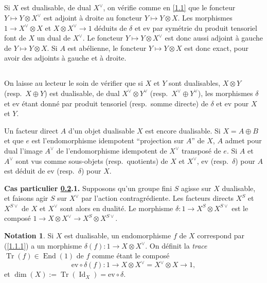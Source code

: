 \documentclass[11pt,a4paper]{article}
\theoremstyle{plain}
\theoremstyle{definition}
\newtheorem{notation}[theorem]{Notation}
\DeclareMathOperator{\End}{End}
\DeclareMathOperator{\Tr}{Tr}
\DeclareMathOperator{\Id}{Id}
\newcommand{\ev}{\mathrm{ev}}
\begin{document}
\subsection{}\label{1.14}

Si $X$ est dualisable, de dual $X^\vee$, on v\'erifie comme en \ref{1.1} que le foncteur $Y\mapsto Y\otimes X^\vee$ est adjoint \`a droite au foncteur $Y\mapsto Y\otimes X$. Les morphismes $1\to X^\vee\otimes X$ et $X\otimes X^\vee\to 1$ d\'eduits de $\delta$ et $\ev$ par sym\'etrie du produit tensoriel font de $X$ un dual de $X^\vee$. Le foncteur $Y\mapsto Y\otimes X^\vee$ est donc aussi adjoint \`a gauche de $Y\mapsto Y\otimes X$. Si $A$ est ab\'elienne, le foncteur $Y\mapsto Y\otimes X$ est donc exact, pour avoir des adjoints \`a gauche et \`a droite.

\subsection{}\label{1.15}

On laisse au lecteur le soin de v\'erifier que si $X$ et $Y$ sont dualisables, $X\otimes Y$ (resp.~$X\oplus Y$) est dualisable, de dual $X^\vee\otimes Y^\vee$ (resp.~$X^\vee\oplus Y^\vee$), les morphismes $\delta$ et $\ev$ \'etant donn\'e par produit tensoriel (resp.~somme directe) de $\delta$ et $\ev$ pour $X$ et $Y$.

Un facteur direct $A$ d'un objet dualisable $X$ est encore dualisable. Si $X=A\oplus B$ et que $e$ est l'endomorphisme idempotent ``projection sur $A$'' de $X$, $A$ admet pour dual l'image $A^\vee$ de l'endomorphisme idempotent de $X^\vee$ transpos\'e de $e$. Si $A$ et $A^\vee$ sont vus comme sous-objets (resp.~quotients) de $X$ et $X^\vee$, $\ev$ (resp.~$\delta$) pour $A$ est d\'eduit de $\ev$ (resp.~$\delta$) pour $X$.

\medskip\noindent\textbf{Cas particulier \ref{1.15}.1.} Supposons qu'un groupe fini $S$ agisse sur $X$ dualisable, et faisons agir $S$ sur $X^\vee$ par l'action contragr\'ediente. Les facteurs directs $X^S$ et $X^{S\vee}$ de $X$ et $X^\vee$ sont alors en dualit\'e. Le morphisme $\delta:1\to X^S\otimes X^{S\vee}$ est le compos\'e $1\to X\otimes X^\vee\to X^S\otimes X^{S\vee}$.

\begin{notation}\label{1.16}
Si $X$ est dualisable, un endomorphisme $f$ de $X$ correspond par (\ref{1.1.1}) a un morphisme $\delta(f):1\to X\otimes X^\vee$. On d\'efinit la \emph{trace} $\Tr(f)\in\End(1)$ de $f$ comme \'etant le compos\'e
\[
\ev\circ\delta(f):1\to X\otimes X^\vee=X^\vee\otimes X\to 1,
\]
et $\dim(X):=\Tr(\Id_X)=\ev\circ\delta$.
\end{notation}
\end{document}
